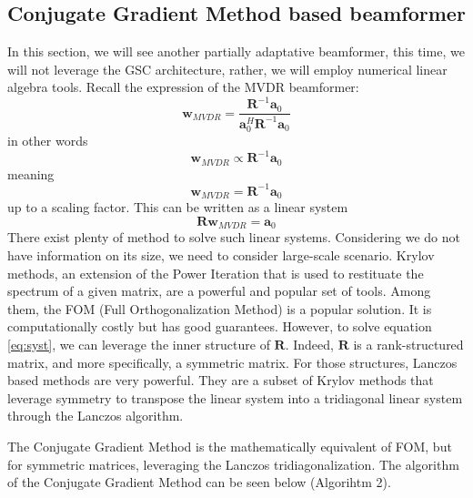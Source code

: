 \documentclass[12pt]{article}
\begin{document}
\subsection{Conjugate Gradient Method based beamformer}
In this section, we will see another partially adaptative beamformer, this time, we will not leverage the GSC architecture, rather, we will employ numerical linear algebra tools. Recall the expression of the MVDR beamformer:
\begin{equation}
    \mathbf{w}_{MVDR} = \frac{\mathbf{R}^{-1}\mathbf{a}_0}{\mathbf{a}_0^H\mathbf{R}^{-1}\mathbf{a}_0}
\end{equation}
in other words
\begin{equation}
    \mathbf{w}_{MVDR} \propto \mathbf{R}^{-1}\mathbf{a}_0
\end{equation}
meaning
\begin{equation}
    \mathbf{w}_{MVDR} = \mathbf{R}^{-1}\mathbf{a}_0
\end{equation}
up to a scaling factor. This can be written as a linear system
\begin{equation}\label{eq:syst}
    \mathbf{R}\mathbf{w}_{MVDR} = \mathbf{a}_0
\end{equation}
There exist plenty of method to solve such linear systems. Considering we do not have information on its size, we need to consider large-scale scenario. Krylov methods, an extension of the Power Iteration that is used to restituate the spectrum of a given matrix, are a powerful and popular set of tools. Among them, the FOM (Full Orthogonalization Method) is a popular solution. It is computationally costly but has good guarantees. However, to solve equation \ref{eq:syst}, we can leverage the inner structure of $\mathbf{R}$. Indeed, $\mathbf{R}$ is a rank-structured matrix, and more specifically, a symmetric matrix. For those structures, Lanczos based methods are very powerful. They are a subset of Krylov methods that leverage symmetry to transpose the linear system into a tridiagonal linear system through the Lanczos algorithm.

The Conjugate Gradient Method is the mathematically equivalent of FOM, but for symmetric matrices, leveraging the Lanczos tridiagonalization. The algorithm of the Conjugate Gradient Method can be seen below (Algorihtm 2).
\end{document}
